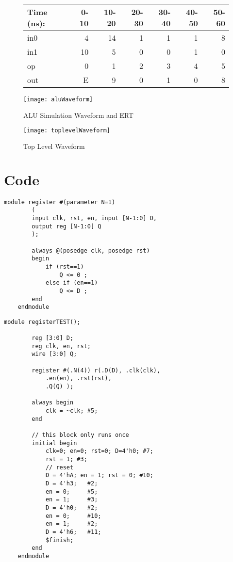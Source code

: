 \documentclass[11pt]{article}
\begin{document}
\begin{figure}[ht]\centering
	
	\begin{tabular}{l|rrrrrr}
		Time (ns): & 0-10 & 10-20 & 20-30 & 30-40 & 40-50 & 50-60 \\
		\midrule
		in0 & 4  & 14& 1 & 1 & 1 & 8 \\
		in1 & 10 & 5 & 0 & 0 & 1 & 0 \\
		op  & 0  & 1 & 2 & 3 & 4 & 5 \\
		\midrule
		out & E  & 9 & 0 & 1 & 0 & 8 \\
		\bottomrule
	\end{tabular}
	\bigskip
	\texttt{[image: aluWaveform]}
	\caption{ALU Simulation Waveform and ERT}
	\label{fig:sim_with_table}
\end{figure}

\begin{figure}[ht]\centering
	\texttt{[image: toplevelWaveform]}
	\caption{Top Level Waveform}
	\label{fig:sim_with_table}
\end{figure}
	\clearpage

\section*{Code}

\begin{lstlisting}[style=Verilog,
caption=Register Source Code,
label=MUX w/ two inputs Source Code
]
	module register #(parameter N=1) 
		(
		input clk, rst, en, input [N-1:0] D,
		output reg [N-1:0] Q
		);
		
		always @(posedge clk, posedge rst) 
		begin
			if (rst==1)
				Q <= 0 ;
			else if (en==1)
				Q <= D ;
		end
	endmodule
\end{lstlisting}

\begin{lstlisting}[style=Verilog,
caption=Register Test,
label=MUX2 Test
]
	module registerTEST();
	
		reg [3:0] D;
		reg clk, en, rst;
		wire [3:0] Q;
		
		register #(.N(4)) r(.D(D), .clk(clk),
			.en(en), .rst(rst),
			.Q(Q) );
		
		always begin 
			clk = ~clk; #5; 
		end
		
		// this block only runs once
		initial begin
			clk=0; en=0; rst=0; D=4'h0; #7;
			rst = 1; #3;
			// reset
			D = 4'hA; en = 1; rst = 0; #10;
			D = 4'h3;   #2;
			en = 0;     #5;
			en = 1;     #3;
			D = 4'h0;   #2;
			en = 0;     #10;
			en = 1;     #2;
			D = 4'h6;   #11;
			$finish;
		end 
	endmodule
\end{lstlisting}
\end{document}
